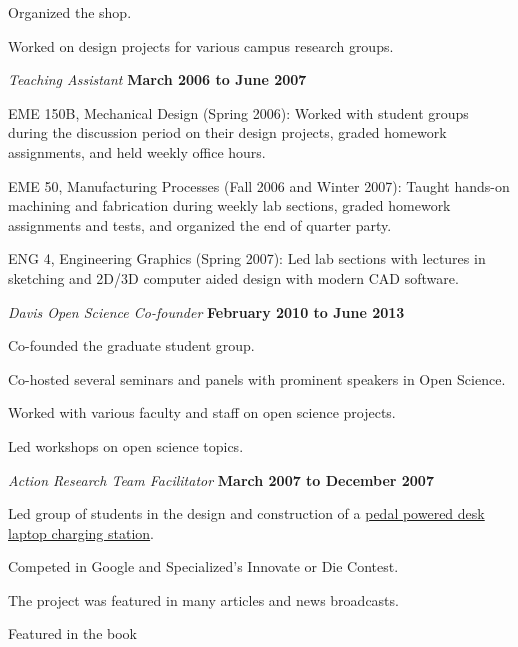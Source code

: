\documentclass[10pt]{article}
\newenvironment{outerlist}[1][\enskip\textbullet]%
        {\begin{itemize}[#1]}{\end{itemize}%
         \vspace{-.6\baselineskip}}
\newenvironment{innerlist}[1][\enskip\textbullet]%
        {\begin{compactitem}[#1]}{\end{compactitem}}
\begin{document}
\begin{outerlist}
\begin{innerlist}
    \item Organized the shop.
    \item Worked on design projects for various campus research groups.
  \end{innerlist}
  \item[] \textit{Teaching Assistant}%
    \hfill \textbf{March 2006 to June 2007}
  \begin{innerlist}
    \item EME 150B, Mechanical Design (Spring 2006): Worked with student groups
        during the discussion period on their design projects, graded homework
        assignments, and held weekly office hours.
    \item EME 50, Manufacturing Processes (Fall 2006 and Winter 2007): Taught
        hands-on machining and fabrication during weekly lab sections, graded
        homework assignments and tests, and organized the end of quarter party.
    \item ENG 4, Engineering Graphics (Spring 2007): Led lab sections with
        lectures in sketching and 2D/3D computer aided design with modern CAD
        software.
  \end{innerlist}
  \item[] \textit{Davis Open Science Co-founder}%
    \hfill \textbf{February 2010 to June 2013}
  \begin{innerlist}
    \item Co-founded the graduate student group.
    \item Co-hosted several seminars and panels with prominent speakers in Open
      Science.
    \item Worked with various faculty and staff on open science projects.
    \item Led workshops on open science topics.
  \end{innerlist}
  \item[] \textit{Action Research Team Facilitator}%
        \hfill \textbf{March 2007 to December 2007}
  \begin{innerlist}
    \item Led group of students in the design and construction of a
        \href{http://mae.ucdavis.edu/~biosport/jkm/ped_desk.htm}{pedal powered
        desk laptop charging station}.
    \item Competed in Google and Specialized's Innovate or Die Contest.
    \item The project was featured in many articles and news broadcasts.
    \item Featured in the book

\end{innerlist}
\end{outerlist}
\end{document}
